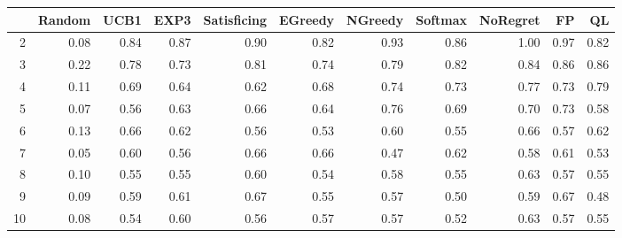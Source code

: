 \begin{table}[ht]
\centering
\begin{tabular}{rrrrrrrrrrr}
  \hline
 & Random & UCB1 & EXP3 & Satisficing & EGreedy & NGreedy & Softmax & NoRegret & FP & QL \\ 
  \hline
2 & 0.08 & 0.84 & 0.87 & 0.90 & 0.82 & 0.93 & 0.86 & 1.00 & 0.97 & 0.82 \\ 
  3 & 0.22 & 0.78 & 0.73 & 0.81 & 0.74 & 0.79 & 0.82 & 0.84 & 0.86 & 0.86 \\ 
  4 & 0.11 & 0.69 & 0.64 & 0.62 & 0.68 & 0.74 & 0.73 & 0.77 & 0.73 & 0.79 \\ 
  5 & 0.07 & 0.56 & 0.63 & 0.66 & 0.64 & 0.76 & 0.69 & 0.70 & 0.73 & 0.58 \\ 
  6 & 0.13 & 0.66 & 0.62 & 0.56 & 0.53 & 0.60 & 0.55 & 0.66 & 0.57 & 0.62 \\ 
  7 & 0.05 & 0.60 & 0.56 & 0.66 & 0.66 & 0.47 & 0.62 & 0.58 & 0.61 & 0.53 \\ 
  8 & 0.10 & 0.55 & 0.55 & 0.60 & 0.54 & 0.58 & 0.55 & 0.63 & 0.57 & 0.55 \\ 
  9 & 0.09 & 0.59 & 0.61 & 0.67 & 0.55 & 0.57 & 0.50 & 0.59 & 0.67 & 0.48 \\ 
  10 & 0.08 & 0.54 & 0.60 & 0.56 & 0.57 & 0.57 & 0.52 & 0.63 & 0.57 & 0.55 \\ 
   \hline
\end{tabular}
\end{table}
